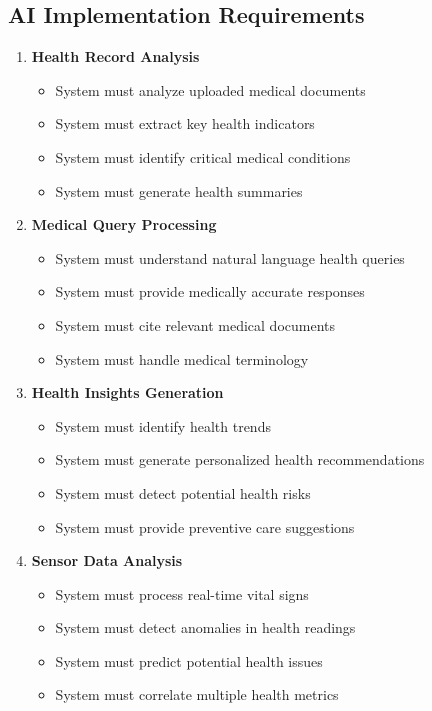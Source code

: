 \subsection{AI Implementation Requirements}

\begin{enumerate}
    \item \textbf{Health Record Analysis}
    \begin{itemize}
        \item System must analyze uploaded medical documents
        \item System must extract key health indicators
        \item System must identify critical medical conditions
        \item System must generate health summaries
    \end{itemize}

    \item \textbf{Medical Query Processing}
    \begin{itemize}
        \item System must understand natural language health queries
        \item System must provide medically accurate responses
        \item System must cite relevant medical documents
        \item System must handle medical terminology
    \end{itemize}

    \item \textbf{Health Insights Generation}
    \begin{itemize}
        \item System must identify health trends
        \item System must generate personalized health recommendations
        \item System must detect potential health risks
        \item System must provide preventive care suggestions
    \end{itemize}

    \item \textbf{Sensor Data Analysis}
    \begin{itemize}
        \item System must process real-time vital signs
        \item System must detect anomalies in health readings
        \item System must predict potential health issues
        \item System must correlate multiple health metrics
    \end{itemize}


\end{enumerate}
